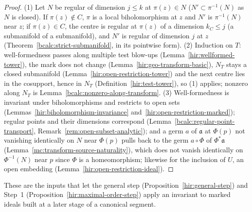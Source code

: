 \begin{proof}
\leanok
(1) Let \(N\) be regular of dimension \(j\le k\) at \(\pi(z)\in N\) (\(N'\subset\pi^{-1}(N)\) as \(N\) is closed). If \(\pi(z)\notin C\), \(\pi\) is a local biholomorphism at \(z\) and
\(N'\) is \(\pi^{-1}(N)\) near \(z\); if \(\pi(z)\in C\), the centre is regular at \(\pi(z)\) of a dimension \(k_C\le j\) (a submanifold of a submanifold), and \(N'\) is regular of
dimension \(j\) at \(z\) (Theorem~\ref{bcalc:strict-submanifold}, in its pointwise form). (2) Induction on \(T\): well-formedness passes along multiple test blow-ups
(Lemma~\ref{hir:wellformed-tower}), the mark does not change (Lemma~\ref{hir:geo-transform-basic}), \(N_T\) stays a closed submanifold (Lemma~\ref{hir:open-restriction-tower}) and
the next centre lies in the cosupport, hence in \(N_T\) (Definition~\ref{hir:test-tower}), so (1) applies; nonzero along \(N_T\) is Lemma~\ref{bcalc:nonzero-along-transform}. (3)
Well-formedness is invariant under biholomorphisms and restricts to open sets (Lemmas~\ref{hir:biholomorphism-invariance} and~\ref{hir:open-restriction-marked}); regular points and
their dimensions correspond (Lemma~\ref{bcalc:regular-point-transport}, Remark~\ref{rem:open-subset-analytic}); and a germ \(a\) of \(\mathfrak a\) at \(\Phi(p)\) not vanishing
identically on \(N\) near \(\Phi(p)\) pulls back to the germ \(a\circ\Phi\) of \(\Phi^*\mathfrak a\) (Lemma~\ref{mc:transform-source-naturality}), which does not vanish identically on
\(\Phi^{-1}(N)\) near \(p\) since \(\Phi\) is a homeomorphism; likewise for the inclusion of \(U\), an open embedding (Lemma~\ref{hir:open-restriction-ideal}).
\end{proof}
These are the inputs that let the general step (Proposition~\ref{hir:general-step}) and Step~1 (Proposition~\ref{hir:maximal-order-step}) apply an invariant to marked ideals
built at a later stage of a canonical segment.

